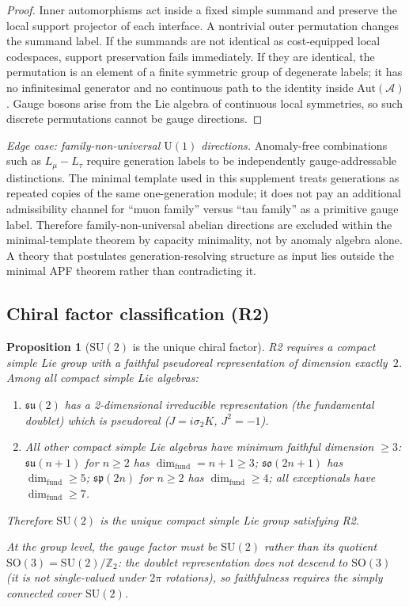 \documentclass[11pt]{article}
\newtheorem{proposition}[theorem]{Proposition}
\theoremstyle{definition}
\newcommand{\SU}{\mathrm{SU}}
\newcommand{\U}{\mathrm{U}}
\begin{document}
\begin{proof}
Inner automorphisms act inside a fixed simple summand and preserve the local
support projector of each interface.  A nontrivial outer permutation changes
the summand label.  If the summands are not identical as cost-equipped local
codespaces, support preservation fails immediately.  If they are identical,
the permutation is an element of a finite symmetric group of degenerate
labels; it has no infinitesimal generator and no continuous path to the
identity inside $\mathrm{Aut}(\mathcal A)$.  Gauge bosons arise from the
Lie algebra of continuous local symmetries, so such discrete permutations
cannot be gauge directions.
\end{proof}

\smallskip\noindent\textit{Edge case: family-non-universal $\U(1)$ directions.}\quad
Anomaly-free combinations such as $L_\mu-L_\tau$ require generation labels
to be independently gauge-addressable distinctions.  The minimal template
used in this supplement treats generations as repeated copies of the same
one-generation module; it does not pay an additional admissibility channel for
``muon family'' versus ``tau family'' as a primitive gauge label.  Therefore
family-non-universal abelian directions are excluded within the minimal-template
theorem by capacity minimality, not by anomaly algebra alone.  A theory that
postulates generation-resolving structure as input lies outside the minimal
APF theorem rather than contradicting it.

\subsection{Chiral factor classification (R2)}
\label{sec:R2_classification}

\begin{proposition}[$\SU(2)$ is the unique chiral factor]\label{prop:R2_unique}
R2 requires a compact simple Lie group with a faithful pseudoreal
representation of dimension exactly~$2$.  Among all compact simple Lie
algebras:
\begin{enumerate}[label=(\roman*),nosep]
  \item $\mathfrak{su}(2)$ has a 2-dimensional irreducible representation
        (the fundamental doublet) which is pseudoreal
        ($J = i\sigma_2 K$, $J^2 = -1$).
  \item All other compact simple Lie algebras have minimum faithful
        dimension $\ge 3$: $\mathfrak{su}(n+1)$ for $n \ge 2$ has
        $\dim_{\mathrm{fund}} = n + 1 \ge 3$; $\mathfrak{so}(2n+1)$
        has $\dim_{\mathrm{fund}} \ge 5$; $\mathfrak{sp}(2n)$ for $n \ge 2$
        has $\dim_{\mathrm{fund}} \ge 4$; all exceptionals have
        $\dim_{\mathrm{fund}} \ge 7$.
\end{enumerate}
Therefore $\SU(2)$ is the unique compact simple Lie group satisfying R2.

At the group level, the gauge factor must be $\SU(2)$ rather than its
quotient $\mathrm{SO}(3) = \SU(2)/\mathbb{Z}_2$: the doublet
representation does not descend to $\mathrm{SO}(3)$ (it is not
single-valued under $2\pi$ rotations), so faithfulness requires
the simply connected cover $\SU(2)$.
\end{proposition}
\end{document}
